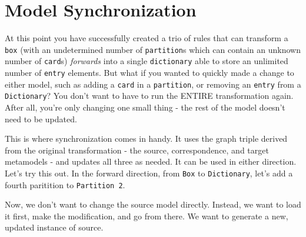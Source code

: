 \newpage
\section{Model Synchronization}
\genHeader

At this point you have successfully created a trio of rules that can transform a \texttt{box} (with an undetermined number of \texttt{partition}s which can
contain an unknown number of \texttt{card}s) \emph{forwards} into a single \texttt{dictionary} able to store an unlimited number of \texttt{entry} elements. 
But what if you wanted to quickly made a change to either model, such as adding a \texttt{card} in a \texttt{partition}, or removing an \texttt{entry} from a
\texttt{Dictionary}? You don't want to have to run the ENTIRE transformation again. After all, you're only changing one small thing - the rest of the model
doesn't need to be updated.

This is where synchronization comes in handy. It uses the graph triple derived from the original transformation - the source, correspondence, and target
metamodels - and updates all three as needed. It can be used in either direction. Let's try this out. In the forward direction, from \texttt{Box} to
\texttt{Dictionary}, let's add a fourth paritition to \texttt{Partition 2}.

Now, we don't want to change the source model directly. Instead, we want to load it first, make the modification, and go from there. We want to generate a new,
updated instance of source.

